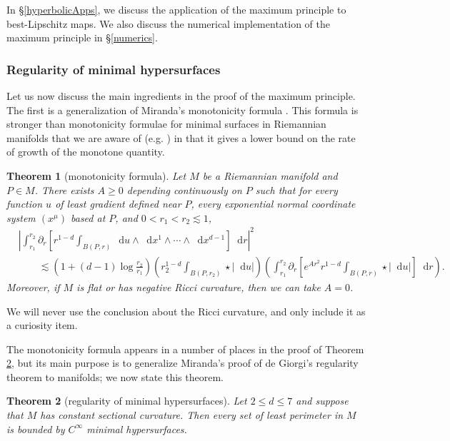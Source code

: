\documentclass[reqno,10pt]{amsart}
\newcommand*\dif{\mathop{}\!\mathrm{d}}
\newtheorem{theorem}{Theorem}[section]
\theoremstyle{definition}
\numberwithin{equation}{section}
\begin{document}
In \S\ref{hyperbolicApps}, we discuss the application of the maximum principle to best-Lipschitz maps.
We also discuss the numerical implementation of the maximum principle in \S\ref{numerics}.

\subsubsection{Regularity of minimal hypersurfaces}
Let us now discuss the main ingredients in the proof of the maximum principle.
The first is a generalization of Miranda's monotonicity formula \cite[Theorem 2.8]{Miranda66}.
This formula is stronger than monotonicity formulae for minimal surfaces in Riemannian manifolds that we are aware of (e.g. \cite[\S7]{MarquesXX}) in that it gives a lower bound on the rate of growth of the monotone quantity.

\begin{theorem}[monotonicity formula]\label{monotonicity prestate}
Let $M$ be a Riemannian manifold and $P \in M$. There exists $A \geq 0$ depending continuously on $P$ such that for every function $u$ of least gradient defined near $P$, every exponential normal coordinate system $(x^\mu)$ based at $P$, and $0 < r_1 < r_2 \lesssim 1$,
\begin{align*}
&\left|\int_{r_1}^{r_2} \partial_r \left[r^{1 - d} \int_{B(P, r)} \dif u \wedge \dif x^1 \wedge \cdots \wedge \dif x^{d - 1}\right] \dif r\right|^2 \\
&\qquad \lesssim \left(1 + (d - 1) \log \frac{r_2}{r_1}\right) \left(r_2^{1 - d}\int_{B(P, r_2)} \star |\dif u| \right)\left(\int_{r_1}^{r_2} \partial_r \left[e^{Ar^2} r^{1 - d} \int_{B(P, r)} \star |\dif u|\right] \dif r\right).
\end{align*}
Moreover, if $M$ is flat or has negative Ricci curvature, then we can take $A = 0$.
\end{theorem}

We will never use the conclusion about the Ricci curvature, and only include it as a curiosity item.

The monotonicity formula appears in a number of places in the proof of Theorem \ref{main lma}, but its main purpose is to generalize Miranda's proof \cite{Miranda66} of de Giorgi's regularity theorem \cite{deGiorgi61} to manifolds; we now state this theorem.

\begin{theorem}[regularity of minimal hypersurfaces]\label{main lma}
Let $2 \leq d \leq 7$ and suppose that $M$ has constant sectional curvature.
Then every set of least perimeter in $M$ is bounded by $C^\infty$ minimal hypersurfaces.
\end{theorem}
\end{document}
